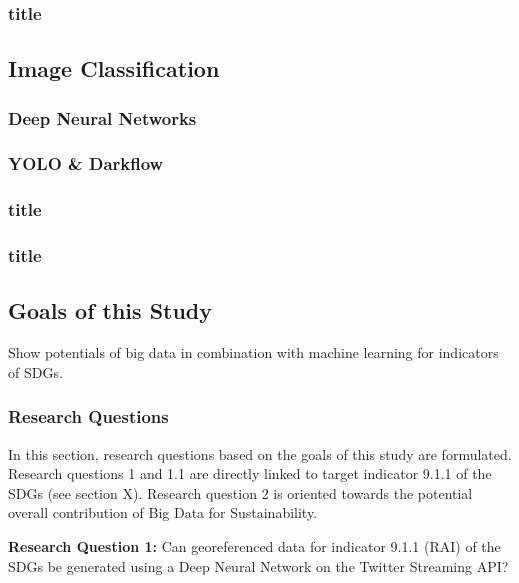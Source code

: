 			\subsubsection{title}
			
			
			
		\subsection{Image Classification}
			\subsubsection{Deep Neural Networks}
			
			\subsubsection{YOLO \& Darkflow}
			
			\subsubsection{title}
			
			\subsubsection{title}
			
			
			
		\subsection{Goals of this Study}
		
		Show potentials of big data in combination with machine learning for indicators of SDGs.
		
		
		
			\subsubsection{Research Questions}
			
			In this section, research questions based on the goals of this study are formulated. Research questions 1 and 1.1 are directly linked to target indicator 9.1.1 of the SDGs (see section X). Research question 2 is oriented towards the potential overall contribution of Big Data for Sustainability.
			
			\bigskip
			
			\begin{tcolorbox}
				\textbf{Research Question 1:} \smallskip Can georeferenced data for indicator 9.1.1 (RAI) of the SDGs be generated using a Deep Neural Network on the Twitter Streaming API?
			\end{tcolorbox}
			
